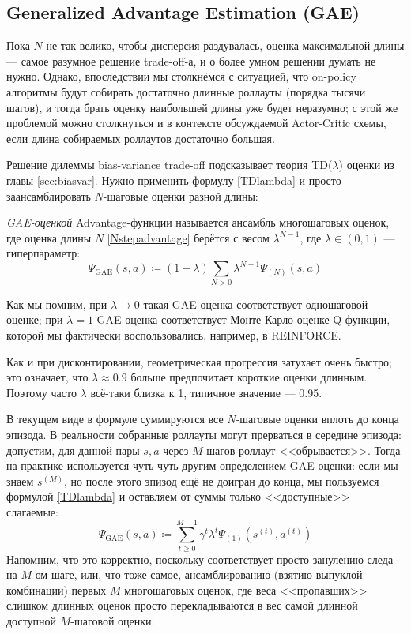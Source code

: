 \subsection{Generalized Advantage Estimation (GAE)}

Пока $N$ не так велико, чтобы дисперсия раздувалась, оценка максимальной длины --- самое разумное решение trade-off-а, и о более умном решении думать не нужно. Однако, впоследствии мы столкнёмся с ситуацией, что on-policy алгоритмы будут собирать достаточно длинные роллауты (порядка тысячи шагов), и тогда брать оценку наибольшей длины уже будет неразумно; с этой же проблемой можно столкнуться и в контексте обсуждаемой Actor-Critic схемы, если длина собираемых роллаутов достаточно большая.

Решение дилеммы bias-variance trade-off подсказывает теория TD($\lambda$) оценки из главы \ref{sec:biasvar}. Нужно применить формулу \eqref{TDlambda} и просто заансамблировать $N$-шаговые оценки разной длины:

\begin{definition}
\emph{GAE-оценкой} Advantage-функции называется ансамбль многошаговых оценок, где оценка длины $N$ \eqref{Nstepadvantage} берётся с весом $\lambda^{N-1}$, где $\lambda \in (0, 1)$ --- гиперпараметр:
\begin{equation}\label{GAEadest}
\Psi_{\mathrm{GAE}}(s, a) \coloneqq (1 - \lambda) \sum_{N > 0} \lambda^{N-1} \Psi_{(N)}(s, a)
\end{equation}
\end{definition}

Как мы помним, при $\lambda \to 0$ такая GAE-оценка соответствует одношаговой оценке; при $\lambda = 1$ GAE-оценка соответствует Монте-Карло оценке Q-функции, которой мы фактически воспользовались, например, в REINFORCE.

\begin{remark}
Как и при дисконтировании, геометрическая прогрессия затухает очень быстро; это означает, что $\lambda \approx 0.9$ больше предпочитает короткие оценки длинным. Поэтому часто $\lambda$ всё-таки близка к 1, типичное значение --- 0.95.
\end{remark}

В текущем виде в формуле суммируются все $N$-шаговые оценки вплоть до конца эпизода. В реальности собранные роллауты могут прерваться в середине эпизода: допустим, для данной пары $s, a$ через $M$ шагов роллаут <<обрывается>>. Тогда на практике используется чуть-чуть другим определением GAE-оценки: если мы знаем $s^{(M)}$, но после этого эпизод ещё не доигран до конца, мы пользуемся формулой \eqref{TDlambda} и оставляем от суммы только <<доступные>> слагаемые:
\begin{equation}\label{truncatedGAE}
\Psi_{\mathrm{GAE}}(s, a) \coloneqq \sum_{t \ge 0}^{M - 1} \gamma^t \lambda^t \Psi_{(1)}(s^{(t)}, a^{(t)})
\end{equation}
Напомним, что это корректно, поскольку соответствует просто занулению следа на $M$-ом шаге, или, что тоже самое, ансамблированию (взятию выпуклой комбинации) первых $M$ многошаговых оценок, где веса <<пропавших>> слишком длинных оценок просто перекладываются в вес самой длинной доступной $M$-шаговой оценки:

